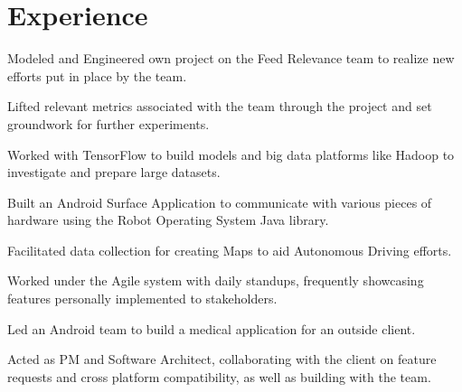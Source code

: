 \documentclass[]{format}
\begin{document}
\begin{minipage}[t]{0.66\textwidth} 


\section{Experience}
\vspace{\topsep} %
\begin{tightemize}
\item Modeled and Engineered own project on the Feed Relevance team to realize new efforts put in place by the team.
\item Lifted relevant metrics associated with the team through the project and set groundwork for further experiments.
\item Worked with TensorFlow to build models and big data platforms like Hadoop to investigate and prepare large datasets.
\end{tightemize}
\sectionsep

\begin{tightemize}
\item Built an Android Surface Application to communicate with various pieces of hardware using the Robot Operating System Java library.
\item Facilitated data collection for creating Maps to aid Autonomous Driving efforts.
\item Worked under the Agile system with daily standups, frequently showcasing features personally implemented to stakeholders.
\end{tightemize}
\sectionsep

\begin{tightemize}
\item Led an Android team to build a medical application for an outside client. 
\item Acted as PM and Software Architect, collaborating with the client on feature requests and cross platform compatibility, as well as building with the team.
\end{tightemize}
\sectionsep


\end{minipage}
\end{document}
